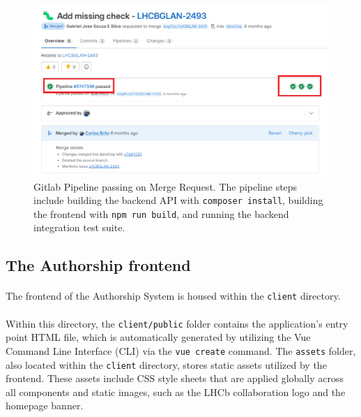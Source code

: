 \begin{figure}[H]
    \centering
    \includegraphics[width=0.8\linewidth]{figuras/tcc_pipeline.png}
    \caption{Gitlab Pipeline passing on Merge Request. The pipeline steps include building the backend API with \texttt{composer install}, building the frontend with \texttt{npm run build}, and running the backend integration test suite.}
    \label{fig:pipeline}
\end{figure}





\subsection{The Authorship frontend}

\paragraph{} The frontend of the Authorship System is housed within the \verb|client| directory. 


\paragraph{} Within this directory, the \verb|client/public| folder contains the application's entry point HTML file, which is automatically generated by utilizing the Vue Command Line Interface (CLI) via the \verb|vue create| command. The \verb|assets| folder, also located within the \verb|client| directory, stores static assets utilized by the frontend. These assets include CSS style sheets that are applied globally across all components and static images, such as the LHCb collaboration logo and the homepage banner.

